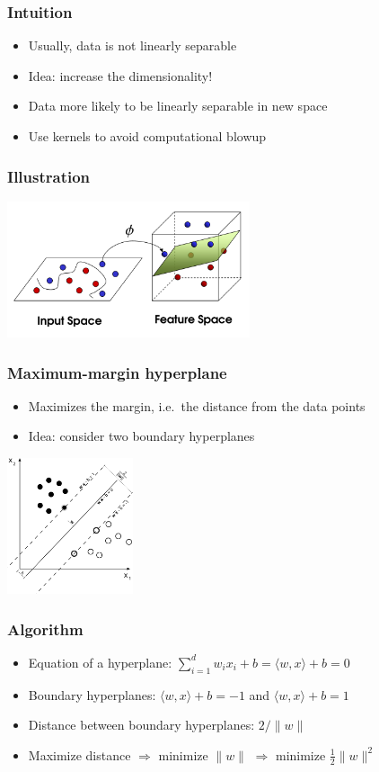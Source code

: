 \documentclass[10pt]{beamer}
\begin{document}
\begin{frame}
  \frametitle{Intuition}
  \begin{itemize}
    \item Usually, data is not linearly separable
	\item Idea: {\color{red} increase} the dimensionality!
	\item Data more likely to be linearly separable in new space
	\item Use {\color{blue} kernels} to avoid computational blowup
  \end{itemize}
\end{frame}

\begin{frame}
  \frametitle{Illustration}
  \centerline{\includegraphics[height=4cm]{images/feature.png}}
\end{frame}

\begin{frame}
  \frametitle{Maximum-margin hyperplane}
  \begin{itemize}
    \item Maximizes the {\color{red} margin}, i.e.~the distance from the data points
    \item Idea: consider {\color{blue} two} boundary hyperplanes
  \end{itemize}
  \vspace{.4cm}
  \centerline{\includegraphics[height=4cm]{images/margin.png}}
\end{frame}

\begin{frame}
  \frametitle{Algorithm}
  \begin{itemize}
    \item Equation of a hyperplane: $\sum_{i=1}^dw_ix_i + b=\langle w,x\rangle+b=0$
    \item {\color{red} Boundary} hyperplanes: $\langle w,x\rangle+b=-1$ and $\langle w,x\rangle+b=1$
    \item Distance between boundary hyperplanes: $2/\|w\|$
	\item Maximize distance $\Rightarrow$ minimize $\|w\|$ $\Rightarrow$ minimize $\frac 1 2 \|w\|^2$
  \end{itemize}
\end{frame}
\end{document}

